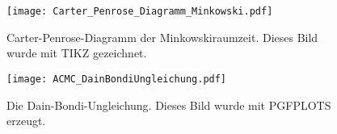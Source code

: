 \lipsum[2]

\begin{figure}[ht!]
\centering
\texttt{[image: Carter\_Penrose\_Diagramm\_Minkowski.pdf]}
\caption{Carter-Penrose-Diagramm der Minkowskiraumzeit. Dieses Bild wurde mit TIKZ gezeichnet.}
\label{fig:CarterPenrose_Minkowski}
\end{figure}

\lipsum[3]

\begin{figure}[ht!]
\centering
\texttt{[image: ACMC\_DainBondiUngleichung.pdf]}
\caption{Die Dain-Bondi-Ungleichung. Dieses Bild wurde mit PGFPLOTS erzeugt.}
\label{fig:Expansionen_Schwarzschild}
\end{figure}

\lipsum[5]